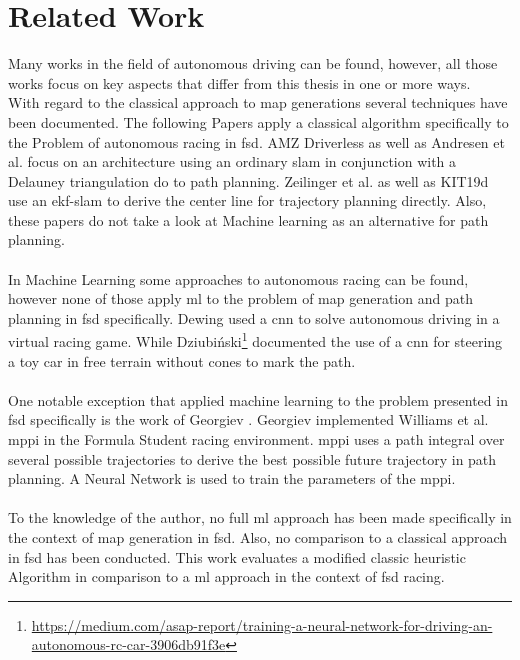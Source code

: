 \section{Related Work}
Many works in the field of autonomous driving can be found, however, all those works focus on key aspects that differ from this thesis in one or more ways. \\
With regard to the classical approach to map generations several techniques have been documented. The following Papers apply a classical algorithm specifically to the Problem of autonomous racing in \ac{fsd}. AMZ Driverless \cite{kabzan2019amz} as well as Andresen et al. \cite{andresen2020} focus on an architecture using an ordinary \ac{slam} in conjunction with a Delauney triangulation do to path planning. Zeilinger et al. \cite{zeilinger2017} as well as KIT19d \cite{nekkah2020} use an \ac{ekf}-\ac{slam} to derive the center line for trajectory planning directly. Also, these papers do not take a look at Machine learning as an alternative for path planning.\\
\\
In Machine Learning some approaches to autonomous racing can be found, however none of those apply \ac{ml} to the problem of map generation and path planning in \ac{fsd} specifically. Dewing \cite{DewingNowTI}
used a \ac{cnn} to solve autonomous driving in a virtual racing game. While Dziubiński\footnote{\url{https://medium.com/asap-report/training-a-neural-network-for-driving-an-autonomous-rc-car-3906db91f3e}} documented the use of a \ac{cnn} for steering a toy car in free terrain without cones to mark the path.\\
\\
One notable exception that applied machine learning to the problem presented in \ac{fsd} specifically is the work of Georgiev \cite{georgiev2019}. Georgiev implemented Williams et al. \cite{williams2016} \ac{mppi} in the Formula Student racing environment. \ac{mppi} uses a path integral over several possible trajectories to derive the best possible future trajectory in path planning. A Neural Network is used to train the parameters of the \ac{mppi}.\\
\\
To the knowledge of the author, no full \ac{ml} approach has been made specifically in the context of map generation in \ac{fsd}. Also, no comparison to a classical approach in \ac{fsd} has been conducted. This work evaluates a modified classic heuristic Algorithm in comparison to a \ac{ml} approach in the context of \ac{fsd} racing.

